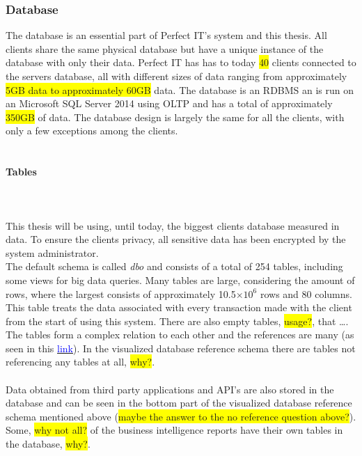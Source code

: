 \documentclass{cslthse-msc}
\newcommand{\hilight}[1]{\colorbox{yellow}{#1}}
\begin{document}
\subsubsection{Database}
The database is an essential part of Perfect IT's system and this thesis. All clients share the same physical database but have a unique instance of the database with only their data.  Perfect IT has has to today \hilight{40} clients connected to the servers database, all with different sizes of data ranging from approximately \hilight{5GB data to approximately 60GB} data. The database is an RDBMS an is run on an Microsoft SQL Server 2014 using OLTP and has a total of approximately \hilight{350GB} of data. The database design is largely the same for all the clients, with only a few exceptions among the clients.\\\\ 

\paragraph*{Tables}\mbox{}\\\\
This thesis will be using, until today, the biggest clients database measured in data. To ensure the clients privacy, all sensitive data has been encrypted by the system administrator. \\The default schema is called \textit{dbo} and consists of a total of 254 tables, including some views for big data queries. Many tables are large, considering the amount of rows, where the largest consists of approximately 10.5$\times 10^6$ rows and 80 columns. This table treats the data associated with every transaction made with the client from the start of using this system. There are also empty tables, \hilight{usage?}, that \ldots. The tables form a complex relation to each other and the references are many (as seen in this \href{https://drive.google.com/file/d/0B1IYTmE2hnD-eGQ0N2tvYXZNNVE/view?usp=sharing}{\textcolor{blue}{link}}). In the visualized database reference schema there are tables not referencing any tables at all, \hilight{why?}.\\\\Data obtained from third party applications and API's are also stored in the database and can be seen in the bottom part of the visualized database reference schema mentioned above (\hilight{maybe the answer to the no reference question above?}). Some, \hilight{why not all?} of the business intelligence reports have their own tables in the database, \hilight{why?}.
\end{document}
